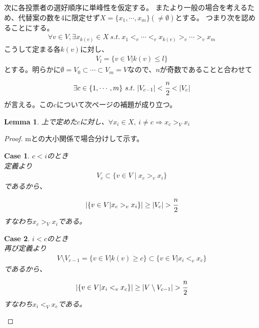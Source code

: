 \documentclass[10pt,uplatex]{jsarticle}
\theoremstyle{case}
\newtheorem{case}{Case}
\begin{document}
    次に各投票者の選好順序に単峰性を仮定する。
    またより一般の場合を考えるため、代替案の数を4に限定せず$X=\{x_1,\cdots ,x_m\}(\neq\emptyset)$とする。
    つまり次を認めることにする。
    \begin{eqnarray*}
        \forall v\in V, \exists x_{k(v)}\in X\ s.t.\ x_1<_v\cdots<_v x_{k(v)}>_v\cdots>_v x_m
    \end{eqnarray*}
    こうして定まる各$k(v)$に対し、
    \begin{eqnarray*}
        V_l=\{v\in V|k(v)\le l\}
    \end{eqnarray*}
    とする。明らかに$\emptyset=V_0\subset\cdots\subset V_m=V$なので、$n$が奇数であることと合わせて
    \begin{eqnarray*}
        \exists c\in\{1,\cdots,m\}\ s.t.\ |V_{c-1}|<\cfrac{n}{2}<|V_c|
    \end{eqnarray*}
    が言える。この$c$について次ページの補題が成り立つ。
    \newpage
    \newtheorem*{lemma}{Lemma}
    \begin{lemma}
        上で定めた$c$に対し、$\forall x_i\in X,\ i\neq c\Rightarrow x_c>_V x_i$
    \end{lemma}
    \begin{proof}
    mとの大小関係で場合分けして示す。
        \begin{case} $c<i$のとき\\
            定義より
            \begin{eqnarray*}
                V_c\subset\{v\in V\mid x_c>_v x_i\}
            \end{eqnarray*}
            であるから、
            \begin{eqnarray*}
                |\{v\in V|x_c>_v x_i\}|\ge |V_c|>\cfrac{n}{2}
            \end{eqnarray*}
            すなわち$x_c>_V x_i$である。
        \end{case}
        \begin{case} $i<c$のとき\\
            再び定義より
            \begin{eqnarray*}
                V\setminus V_{c-1}=\{v\in V|k(v)\ge c\}\subset\{v\in V|x_i<_v x_c\}
            \end{eqnarray*}
            であるから、
            \begin{eqnarray*}
                |\{v\in V|x_i<_v x_c\}|\ge |V\setminus V_{c-1}|>\cfrac{n}{2}
            \end{eqnarray*}
            すなわち$x_i<_V x_c$である。
        \end{case}
    \end{proof}
\end{document}
